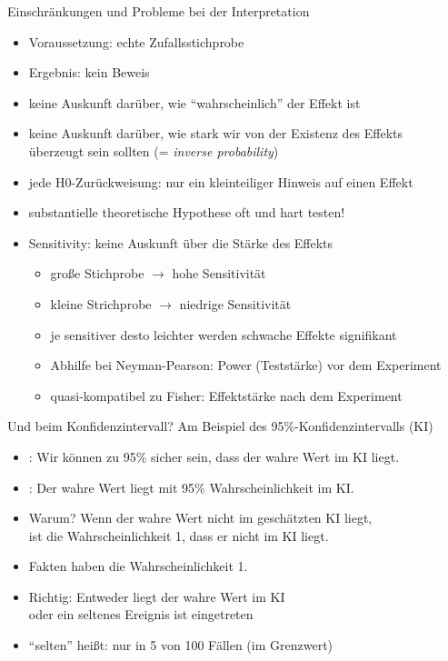 \begin{frame}
  {Einschränkungen und Probleme bei der Interpretation}
  \begin{itemize}
    \item Voraussetzung: \alert{echte Zufallsstichprobe}
    \item Ergebnis: \alert{kein Beweis}
    \item keine Auskunft darüber, wie "`wahrscheinlich"' der Effekt ist
    \item keine Auskunft darüber, wie stark wir von der Existenz des Effekts\\
      überzeugt sein sollten (= \textit{inverse probability})
    \item jede H0-Zurückweisung: nur ein kleinteiliger Hinweis auf einen Effekt
    \item \alert{substantielle} theoretische Hypothese oft und hart testen!
      \vspace{\baselineskip}
    \item \alert{Sensitivity}: keine Auskunft über die \alert{Stärke} des Effekts
      \begin{itemize}
        \item große Stichprobe $\rightarrow$ hohe Sensitivität
        \item kleine Strichprobe $\rightarrow$ niedrige Sensitivität
        \item je sensitiver desto leichter werden schwache Effekte signifikant
        \item Abhilfe bei Neyman-Pearson: \alert{Power} (Teststärke) vor dem Experiment
        \item quasi-kompatibel zu Fisher: \alert{Effektstärke} nach dem Experiment
      \end{itemize}
  \end{itemize}
\end{frame}

\begin{frame}
  {Und beim Konfidenzintervall?}
  Am Beispiel des 95\%-Konfidenzintervalls (KI)
  \begin{itemize}
    \item {}: Wir können zu 95\% sicher sein, dass der wahre Wert im KI liegt.
    \item {}: Der wahre Wert liegt mit 95\% Wahrscheinlichkeit im KI.
      \vspace{\baselineskip}
    \item Warum? \alert{Wenn der wahre Wert nicht im geschätzten KI liegt,\\
      ist die Wahrscheinlichkeit 1, dass er nicht im KI liegt.}
    \item Fakten haben die Wahrscheinlichkeit 1.
      \vspace{\baselineskip}
    \item Richtig: Entweder liegt der wahre Wert im KI\\
      \alert{oder ein seltenes Ereignis ist eingetreten}
    \item "`selten"' heißt: nur in 5 von 100 Fällen (im Grenzwert)
  \end{itemize}
\end{frame}


